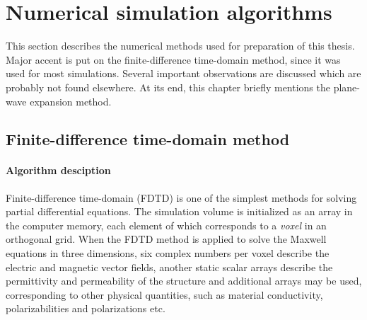 \section{Numerical simulation algorithms} \label{chapter_numerical}
This section describes%
the numerical methods used for preparation of this thesis. Major accent is put on the finite-difference time-domain method, since it was used for most simulations. Several important observations are discussed which are probably not found elsewhere. At its end, this chapter briefly mentions the plane-wave expansion method. 
%
%
\subsection{Finite-difference time-domain method}
\paragraph{Algorithm desciption} %
Finite-difference time-domain (FDTD) is one of the simplest methods for solving partial differential equations. The simulation volume is initialized as an array in the computer memory, each element of which corresponds to a \textit{voxel} in an orthogonal grid. When the FDTD method is applied to solve the Maxwell equations in three dimensions, six complex numbers per voxel describe the electric and magnetic vector fields, another static scalar arrays describe the permittivity and permeability of the structure and additional arrays may be used, corresponding to other physical quantities, such as material conductivity, polarizabilities and polarizations etc. 

